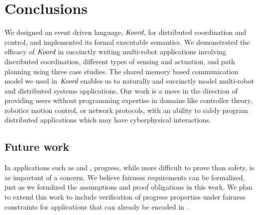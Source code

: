 \section{Conclusions}
\label{sec:conclusion}

We designed an event driven language, $\emph{Koord}$,  for distributed coordination and control, and implemented its formal executable semantics.
We demonstrated the efficacy of $\emph{Koord}$ in succinctly writing multi-robot applications involving discributed coordination, different types of sensing and actuation, and path planning using three case studies. The shared memory based communication model we used in $\emph{Koord}$ enables us to naturally and succinctly model multi-robot and distributed systems applications. Our work is a move in the direction of providing users without programming expertise in domains like controller theory, robotics motion control, or network protocols, with an ability to safely program distributed applications which may have cyberphysical interactions.

\subsection{Future work}
In applications such as \Task and \dmap, progress, while more difficult to prove than safety, is as important of a concern. We believe fairness requirements can be formalized, just as we formlized the assumptions and proof obligations in this work. We plan to extend this work to include verification of progress properties under fairness constraints for applications that can already be encoded in \lgname.